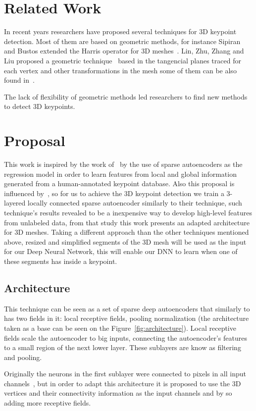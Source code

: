 \documentclass{comjnl}
\begin{document}
\section{Related Work} \label{RelatedWork}
In recent years researchers have proposed several techniques for
3D keypoint detection. Most of them are based on geometric methods, for
instance Sipiran and Bustos extended the Harris operator for 3D
meshes~\cite{harris3D}. Lin, Zhu, Zhang and Liu proposed a geometric
technique~\cite{GMSR} based in the tangencial planes traced for each vertex and
other transformations in the mesh some of them can be also found
in~\cite{DNN}. 

The lack of flexibility of geometric methods led researchers to find new methods
to detect 3D keypoints.  

\section{Proposal} \label{Proposal}
This work is inspired by the work of~\cite{DNN} by the use of
sparse autoencoders as the regression model in order to learn features
from local and global information generated from a human-annotated
keypoint database. Also this proposal is influenced by~\cite{UnsLearning},
so for us to achieve the 3D keypoint detection we train a 3-layered locally
connected sparse autoencoder similarly to their technique, such
technique's results revealed to be a inexpensive way to develop
high-level features from unlabeled data, from that study this work
presents an adapted architecture for 3D meshes. Taking a different approach
than the other techniques mentioned above, resized and simplified segments
of the 3D mesh will be used as the input for our Deep Neural Network,
this will enable our DNN to learn when one of these segments has inside
a keypoint.

\subsection{Architecture}
This technique can be seen as a set of sparse deep autoencoders that
similarly to~\cite{UnsLearning} has two fields in it: local receptive fields,
pooling normalization (the architecture taken as a base can be seen
on the Figure~\ref{fig:architecture}). Local receptive fields scale the
autoencoder to big inputs, connecting the autoencoder's features to a small
region of the next lower layer. These sublayers are know as filtering and
pooling.

Originally the neurons in the first sublayer were connected to
pixels in all input channels~\cite{UnsLearning}, but in order to adapt
this architecture it is proposed to use the 3D vertices and their
connectivity information as the input channels and by so adding more
receptive fields.
\end{document}
